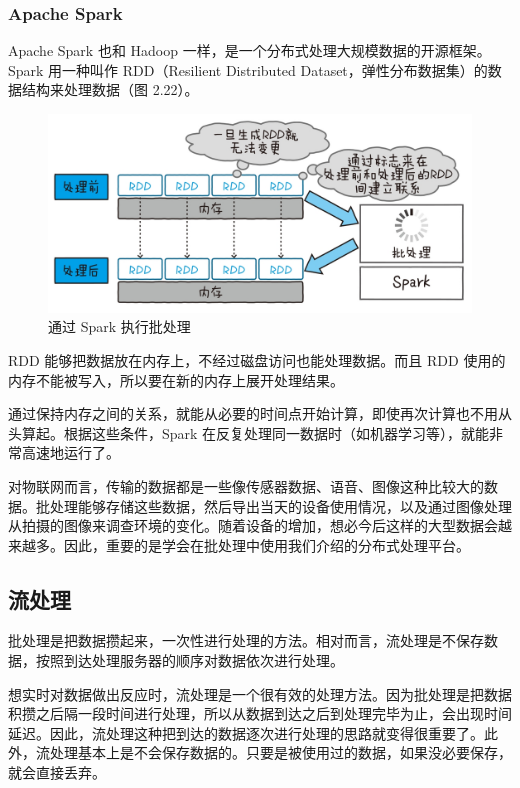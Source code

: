 \documentclass[12pt,UTF8]{ctexbook}
\begin{document}
\subsubsection{Apache Spark}

Apache Spark 也和 Hadoop 一样，是一个分布式处理大规模数据的开源框架。Spark 用一种叫作 RDD（Resilient Distributed Dataset，弹性分布数据集）的数据结构来处理数据（图 2.22）。

\begin{figure}[htbp]
	\centering
	\includegraphics[width=1\linewidth]{41}
	\caption{通过 Spark 执行批处理}
	\label{fig:1}
\end{figure}

RDD 能够把数据放在内存上，不经过磁盘访问也能处理数据。而且 RDD 使用的内存不能被写入，所以要在新的内存上展开处理结果。

通过保持内存之间的关系，就能从必要的时间点开始计算，即使再次计算也不用从头算起。根据这些条件，Spark 在反复处理同一数据时（如机器学习等），就能非常高速地运行了。

对物联网而言，传输的数据都是一些像传感器数据、语音、图像这种比较大的数据。批处理能够存储这些数据，然后导出当天的设备使用情况，以及通过图像处理从拍摄的图像来调查环境的变化。随着设备的增加，想必今后这样的大型数据会越来越多。因此，重要的是学会在批处理中使用我们介绍的分布式处理平台。

\subsection{流处理}

批处理是把数据攒起来，一次性进行处理的方法。相对而言，流处理是不保存数据，按照到达处理服务器的顺序对数据依次进行处理。

想实时对数据做出反应时，流处理是一个很有效的处理方法。因为批处理是把数据积攒之后隔一段时间进行处理，所以从数据到达之后到处理完毕为止，会出现时间延迟。因此，流处理这种把到达的数据逐次进行处理的思路就变得很重要了。此外，流处理基本上是不会保存数据的。只要是被使用过的数据，如果没必要保存，就会直接丢弃。
\end{document}
